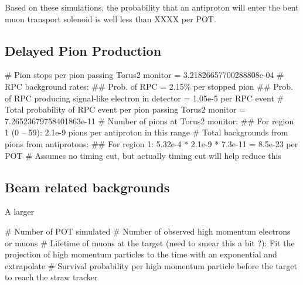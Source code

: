 Based on these simulations, the probability that an antiproton will enter the bent muon transport solenoid is well less than XXXX per POT.

\subsection{Delayed Pion Production}

\begin{easylist}
	# Pion stops per pion passing Torus2 monitor = 3.21826657700288808e-04 %
	# RPC background rates:
	## Prob. of RPC = 2.15\% per stopped pion
	## Prob. of RPC producing signal-like electron in detector = 1.05e-5 per RPC event
	# Total probability of RPC event per pion passing Torus2 monitor = 7.26523679758401863e-11
	# Number of pions at Torus2 monitor: 
	## For region 1 (0 -- 59\degree): 2.1e-9 pions per antiproton in this range
	# Total backgrounds from pions from antiprotons:
	## For region 1: 5.32e-4 * 2.1e-9 * 7.3e-11 = 8.5e-23 per POT
	# Assumes no timing cut, but actually timing cut will help reduce this
\end{easylist}

\subsection{Beam related backgrounds}
A larger 

\begin{easylist}
	# Number of POT simulated
	# Number of observed high momentum electrons or muons
	# Lifetime of muons at the target (need to smear this a bit ?): Fit the projection of high momentum particles to the time with an exponential and extrapolate
	# Survival probability per high momentum particle before the target to reach the straw tracker
\end{easylist}
